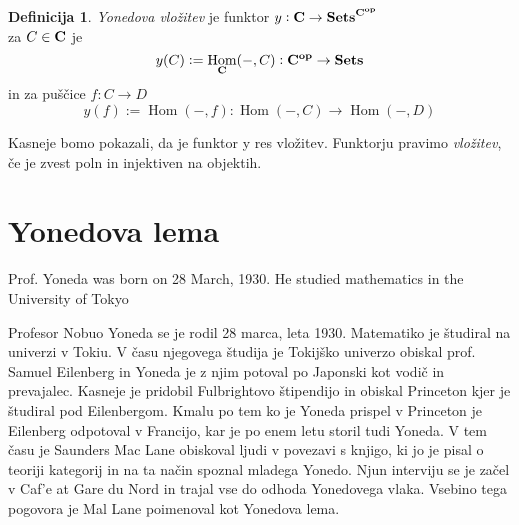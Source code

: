 \documentclass[12pt,a4paper]{book}
\theoremstyle{definition}
\newtheorem{definicija}{Definicija}[chapter]
\theoremstyle{plain}
\theoremstyle{definition}
\theoremstyle{remark}
\DeclareMathOperator{\Hom}{Hom}
\begin{document}
\begin{definicija} {\it Yonedova vložitev} je funktor $y : \bf{C} \to \bf{Sets}^{\bf{C}^{op}}$ \\  za $C \in \bf{C}$ je $$y(C) := \Hom_{\bf{C}}(-, C) : \bf{C}^{op} \to \bf{Sets}$$ in za puščice $f : C \to D$
$$y(f) := \Hom(-,f) : \Hom(-,C) \to \Hom(-,D)$$
\end{definicija}

Kasneje bomo pokazali, da je funktor y res vložitev. Funktorju pravimo {\it vložitev}, če je zvest poln in injektiven na objektih.

\section{Yonedova lema}

Prof. Yoneda was born on 28 March, 1930.  He studied mathematics in
the University of Tokyo

Profesor Nobuo Yoneda se je rodil 28 marca, leta 1930. Matematiko je študiral na univerzi v Tokiu. V času njegovega študija je Tokijško univerzo obiskal prof. Samuel Eilenberg in Yoneda je z njim potoval po Japonski kot vodič in prevajalec. Kasneje je pridobil Fulbrightovo štipendijo in obiskal Princeton kjer je študiral pod Eilenbergom. Kmalu po tem ko je Yoneda prispel v Princeton je Eilenberg odpotoval v Francijo, kar je po enem letu storil tudi Yoneda. V tem času je Saunders Mac Lane obiskoval ljudi v povezavi s knjigo, ki jo je pisal o teoriji kategorij in na ta način spoznal mladega Yonedo. Njun interviju se je začel v Caf'e at Gare du Nord in trajal vse do odhoda Yonedovega vlaka. Vsebino tega pogovora je Mal Lane poimenoval kot Yonedova lema.
\end{document}
